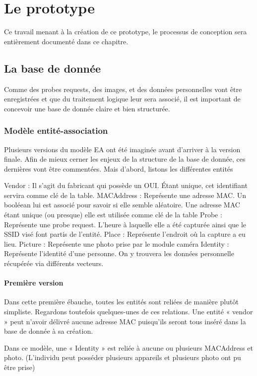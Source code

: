 \chapter{Le prototype}
\label{ch:proto}

Ce travail menant à la création de ce prototype, le processus de conception sera entièrement documenté dans ce
chapitre.

\section{La base de donnée}
Comme des probes requests, des images, et des données personnelles vont être enregistrées et que du traitement
logique leur sera associé, il est important de concevoir une base de donnée claire et bien structurée.

\subsection{Modèle entité-association}
Plusieurs versions du modèle EA ont été imaginée avant d’arriver à la version finale. Afin de mieux cerner les enjeux
de la structure de la base de donnée, ces dernières vont être commentées. Mais d’abord, listons les différentes
entités

Vendor : Il s’agit du fabricant qui possède un OUI. Étant unique, cet identifiant servira comme clé de la table.
MACAddress : Représente une adresse MAC. Un booléean lui est associé pour savoir si elle semble aléatoire. Une
adresse MAC étant unique (ou presque) elle est utilisée comme clé de la table
Probe : Représente une probe request. L’heure à laquelle elle a été capturée ainsi que le SSID visé font partis de
l’entité.
Place : Représente l’endroit où la capture a eu lieu.
Picture : Représente une photo prise par le module caméra
Identity : Représente l’identité d’une personne. On y trouvera les données personnelle récupérée via différents
vecteurs.

\subsubsection{Première version}
Dans cette première ébauche, toutes les entités sont reliées de manière plutôt simpliste. Regardons toutefois
quelques-unes de ces relations.
Une entité « vendor » peut n’avoir délivré aucune adresse MAC puisqu’ils seront tous inséré dans la base de donnée
à sa création.

Dans ce modèle, une « Identity » est reliée à aucune ou plusieurs MACAddress et photo. (L’individu peut posséder
plusieurs appareils et plusieurs photo ont pu être prise)


